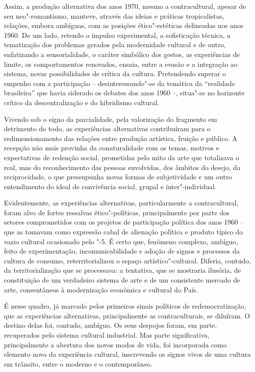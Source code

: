 Assim, a produção alternativa dos anos 1970, mesmo a contracultural,
apesar de seu neo"-romantismo, manteve, através das ideias e práticas
tropicalistas, relações, embora ambíguas, com as posições
ético"-estéticas delineadas nos anos 1960. De um lado, retendo o impulso
experimental, a sofisticação técnica, a tematização dos problemas
gerados pela modernidade cultural e de outro, enfatizando a
sensorialidade, o caráter simbólico dos gestos, as experiências de
limite, os comportamentos renovados, ensaia, entre a evasão e a
integração ao sistema, novas possibilidades de crítica da cultura.
Pretendendo superar o empenho com a participação -- desinteressando"-se
da temática da ``realidade brasileira'' que havia siderado os debates
dos anos 1960 --, situa"-se no horizonte crítico da descentralização e do
hibridismo cultural.

Vivendo sob o signo da parcialidade, pela valorização do fragmento em
detrimento do todo, as experiências alternativas contribuíram para o
redimensionamento das relações entre produção artística, fruição e
público. A recepção não mais provinha da conaturalidade com os temas,
motivos e expectativas de redenção social, prometidas pelo mito da arte
que totalizava o real, mas do reconhecimento das pessoas envolvidas, dos
âmbitos do desejo, da reciprocidade, o que pressupunha novas formas de
subjetividade e um outro entendimento do ideal de convivência social,
grupal e inter"-individual.

Evidentemente, as experiências alternativas, particularmente a
contracultural, foram alvo de fortes ressalvas ético"-políticas,
principalmente por parte dos setores comprometidos com os projetos de
participação política dos anos 1960 -- que as tomavam como expressão
cabal de alienação política e produto típico do vazio cultural
ocasionado pelo "-5. É certo que, fenômeno complexo, ambíguo, feito de
experimentação, incomunicabilidade e adoção de signos e processos da
cultura de consumo, reterritorializou o espaço artístico"-cultural.
Diferia, contudo, da territorialização que se processava: a tentativa,
que se mostraria ilusória, de constituição de um verdadeiro sistema de
arte e de um consistente mercado de arte, consentâneos à modernização
econômica e cultural do País.

É nesse quadro, já marcado pelos primeiros sinais políticos de
redemocratização, que as experiências alternativas, principalmente as
contraculturais, se diluíram. O destino delas foi, contudo, ambíguo. Os
seus despojos foram, em parte, recuperados pelo sistema cultural
industrial. Mas parte significativa, principalmente a abertura dos novos
modos de vida, foi incorporada como elemento novo da experiência
cultural, inscrevendo os signos vivos de uma cultura em trânsito, entre
o moderno e o contemporâneo.


